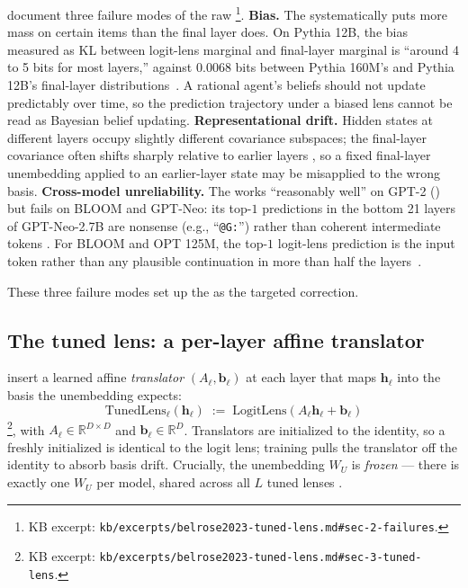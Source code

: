\citet[\S 2]{belrose2023-tuned-lens} document three failure modes of
the raw \footnote{KB excerpt:
\nolinkurl{kb/excerpts/belrose2023-tuned-lens.md#sec-2-failures}.}.
\textbf{Bias.} The  systematically puts more mass on certain
 items than the final layer does. On Pythia 12B, the bias
measured as KL between logit-lens marginal and final-layer marginal is
``around 4 to 5 bits for most layers,'' against $0.0068$ bits between
Pythia 160M's and Pythia 12B's final-layer
distributions~\citep[\S 2]{belrose2023-tuned-lens}. A rational agent's
beliefs should not update predictably over time, so the prediction
trajectory under a biased lens cannot be read as Bayesian belief
updating. \textbf{Representational drift.} Hidden states at different
layers occupy slightly different covariance subspaces; the final-layer
covariance often shifts sharply relative to earlier layers
\citep[\S 3]{belrose2023-tuned-lens}, so a fixed final-layer unembedding
applied to an earlier-layer state may be misapplied to the wrong basis.
\textbf{Cross-model unreliability.} The  works ``reasonably
well'' on GPT-2 (\citealp{radford2019-gpt2}) but fails on BLOOM and
GPT-Neo: its top-$1$ predictions in the bottom 21 layers of GPT-Neo-2.7B
are nonsense (e.g., ``\texttt{@G:}'') rather than coherent intermediate
tokens \citep[\S 2 + Fig.~1]{belrose2023-tuned-lens}. For BLOOM and OPT
125M, the top-$1$ logit-lens prediction is the input token rather than
any plausible continuation in more than half the
layers~\citep[\S 2]{belrose2023-tuned-lens}.

These three failure modes set up the  as the targeted
correction.

\subsection{The tuned lens: a per-layer affine translator}
\label{sec:tuned-lens}

\citet[\S 3]{belrose2023-tuned-lens} insert a learned affine
\emph{translator} $(A_\ell, \mathbf{b}_\ell)$ at each layer that maps
$\mathbf{h}_\ell$ into the basis the unembedding expects:
\begin{equation}
  \boxed{\;\mathrm{TunedLens}_\ell(\mathbf{h}_\ell)
  \;:=\; \mathrm{LogitLens}(A_\ell \mathbf{h}_\ell + \mathbf{b}_\ell)\;}
  \label{eq:tuned-lens}
\end{equation}
\citep[\S 3, Eq.~8]{belrose2023-tuned-lens}\footnote{KB excerpt:
\nolinkurl{kb/excerpts/belrose2023-tuned-lens.md#sec-3-tuned-lens}.},
with $A_\ell \in \mathbb{R}^{D \times D}$ and
$\mathbf{b}_\ell \in \mathbb{R}^D$. Translators are initialized to the
identity, so a freshly initialized  is identical to the logit
lens; training pulls the translator off the identity to absorb basis
drift. Crucially, the unembedding $W_U$ is \emph{frozen} — there is
exactly one $W_U$ per model, shared across all $L$ tuned lenses
\citep[\S 3]{belrose2023-tuned-lens}.


